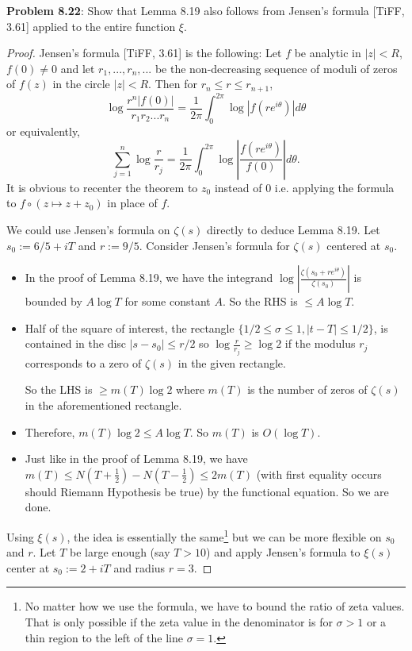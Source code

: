 \documentclass[12pt]{article}
\newcommand{\Abs}[1]{\left| #1 \right|}
\begin{document}
\fi

\textbf{Problem 8.22}: Show that Lemma 8.19 also follows from Jensen's formula [TiFF, 3.61] applied to the entire function $\xi$.

\begin{proof}
Jensen's formula [TiFF, 3.61] is the following: Let $f$ be analytic in $|z| < R$, $f(0) \not= 0$ and let $r_1, ..., r_n, ...$ be the non-decreasing sequence of moduli of zeros of $f(z)$ in the circle $|z| < R$. Then for $r_n \leq r \leq r_{n+1}$,
$$\log \frac{r^n|f(0)|}{r_1 r_2 ... r_n} = \frac{1}{2\pi} \int_0^{2\pi} \log|f(r e^{i\theta})| d\theta$$
or equivalently,
$$\sum_{j = 1}^{n} \log \frac{r}{r_j} = \frac{1}{2\pi} \int_0^{2\pi} \log \Abs{ \frac{f(r e^{i\theta})}{f(0)} } d\theta.$$
It is obvious to recenter the theorem to $z_0$ instead of $0$ i.e. applying the formula to $f \circ (z \mapsto z + z_0)$ in place of $f$.

We could use Jensen's formula on $\zeta(s)$ directly to deduce Lemma 8.19. Let $s_0 := 6/5 + iT$ and $r := 9/5$. Consider Jensen's formula for $\zeta(s)$ centered at $s_0$.
\begin{itemize}
\item In the proof of Lemma 8.19, we have the integrand $\log \Abs{ \frac{\zeta(s_0 + r e^{i\theta})}{\zeta(s_0)} }$ is bounded by $A \log T$ for some constant $A$. So the RHS is $\leq A \log T$.

\item Half of the square of interest, the rectangle $\{1/2 \leq \sigma \leq 1, |t - T| \leq 1/2\}$, is contained in the disc $|s - s_0| \leq r/2$ so $\log \frac{r}{r_j} \geq \log 2$ if the modulus $r_j$ corresponds to a zero of $\zeta(s)$ in the given rectangle. 

So the LHS is $\geq m(T) \log 2$ where $m(T)$ is the number of zeros of $\zeta(s)$ in the aforementioned rectangle.

\item Therefore, $m(T) \log 2 \leq A \log T$. So $m(T)$ is $O(\log T)$.

\item Just like in the proof of Lemma 8.19, we have $m(T) \leq N(T+\frac12) - N(T - \frac12) \leq 2 m(T)$ (with first equality occurs should Riemann Hypothesis be true) by the functional equation. So we are done.
\end{itemize}

Using $\xi(s)$, the idea is essentially the same\footnote{No matter how we use the formula, we have to bound the ratio of zeta values. That is only possible if the zeta value in the denominator is for $\sigma > 1$ or a thin region to the left of the line $\sigma = 1$.} but we can be more flexible on $s_0$ and $r$. Let $T$ be large enough (say $T > 10$) and apply Jensen's formula to $\xi(s)$ center at $s_0 := 2 + iT$ and radius $r = 3$.


\end{proof}
\end{document}
